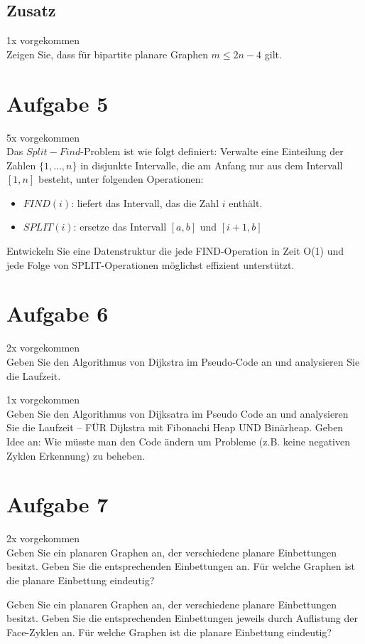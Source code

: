 \documentclass[10pt,a4paper]{article}
\begin{document}
\subsection*{Zusatz}
	1x vorgekommen \\
	Zeigen Sie, dass für bipartite planare Graphen $m\leq2n-4$ gilt.
	
\section*{Aufgabe 5}
	5x vorgekommen \\
	Das $Split-Find$-Problem ist wie folgt definiert: Verwalte eine Einteilung der Zahlen $\{1,...,n\}$ in disjunkte Intervalle, die am Anfang nur aus dem Intervall $[1,n]$ besteht, unter folgenden Operationen:
	\begin{itemize}
		\item $FIND(i)$: liefert das Intervall, das die Zahl $i$ enthält.
		\item $SPLIT(i)$: ersetze das Intervall $[a,b]$ und $[i+1,b]$
	\end{itemize}
	Entwickeln Sie eine Datenstruktur die jede FIND-Operation in Zeit O(1) und jede Folge von SPLIT-Operationen möglichst effizient unterstützt.
	
\section*{Aufgabe 6} 
	2x vorgekommen \\
	Geben Sie den Algorithmus von Dijkstra im Pseudo-Code an und analysieren Sie die Laufzeit.
	
	1x vorgekommen \\
	Geben Sie den Algorithmus von Dijksatra im Pseudo Code an und analysieren Sie die Laufzeit – FÜR Dijkstra mit Fibonachi Heap UND Binärheap.  Geben Idee an: Wie müsste man den Code ändern um Probleme (z.B. keine negativen Zyklen Erkennung) zu beheben.
	
\section*{Aufgabe 7} 
	2x vorgekommen \\
	Geben Sie ein planaren Graphen an, der verschiedene planare Einbettungen besitzt. Geben Sie die entsprechenden Einbettungen an. Für welche Graphen ist die planare Einbettung eindeutig?
	
	Geben Sie ein planaren Graphen an, der verschiedene planare Einbettungen besitzt. Geben Sie die entsprechenden Einbettungen jeweils durch Auflistung der Face-Zyklen an. Für welche Graphen ist die planare Einbettung eindeutig?
	
\end{document}
